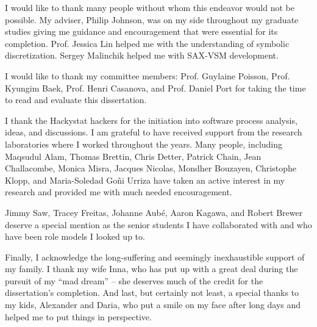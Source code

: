 \begin{acknowledgments}
 
I would like to thank many people without whom this endeavor would not be possible. My adviser, Philip Johnson, was on my side throughout my graduate studies giving me guidance and encouragement that were essential for its completion. Prof. Jessica Lin helped me with the understanding of symbolic discretization. Sergey Malinchik helped me with SAX-VSM development.  

I would like to thank my committee members: Prof. Guylaine Poisson, Prof. Kyungim Baek, Prof. Henri Casanova, and Prof. Daniel Port for taking the time to read and evaluate this dissertation.

I thank the Hackystat hackers for the initiation into software process analysis, ideas, and discussions. I am grateful to have received support from the research laboratories where I worked throughout the years. Many people, including Maqsudul Alam, Thomas Brettin, Chris Detter, Patrick Chain, Jean Challacombe, Monica Misra, Jacques Nicolas, Mondher Bouzayen, Christophe Klopp, and Maria-Soledad Go{\~n}i Urriza have taken an active interest in my research and provided me with much needed encouragement.

Jimmy Saw, Tracey Freitas, Johanne Aub\'{e}, Aaron Kagawa, and Robert Brewer deserve a special mention as the senior students I have collaborated with and who have been role models I looked up to.

Finally, I acknowledge the long-suffering and seemingly inexhaustible support of my family. I thank my wife Inna, who has put up with a great deal during the pursuit of my ``mad dream'' -- she deserves much of the credit for the dissertation's completion. And last, but certainly not least, a special thanks to my kids, Alexander and Daria, who put a smile on my face after long days and helped me to put things in perspective.

\end{acknowledgments}